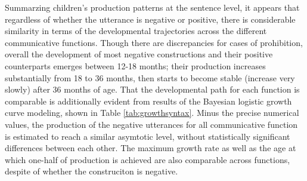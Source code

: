\documentclass[
  english,
  man,floatsintext]{apa6}
\begin{document}
Summarzing children's production patterns at the sentence level, it appears that regardless of whether the utterance is negative or positive, there is considerable similarity in terms of the developmental trajectories across the different communicative functions. Though there are discrepancies for cases of prohibition, overall the development of most negative constructions and their positive counterparts emerges between 12-18 months; their production increases substantially from 18 to 36 months, then starts to become stable (increase very slowly) after 36 months of age. That the developmental path for each function is comparable is additionally evident from results of the Bayesian logistic growth curve modeling, shown in Table \ref{tab:growthsyntax}. Minus the precise numerical values, the production of the negative utterances for all communicative function is estimated to reach a similar asymtotic level, without statistically significant differences between each other. The maximum growth rate as well as the age at which one-half of production is achieved are also comparable across functions, despite of whether the construciton is negative.
\end{document}
